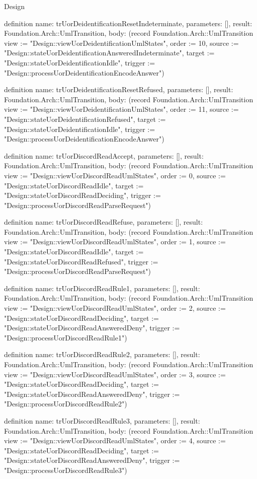 \begin{lexlean}{Design}
\begin{semanticmodule}
definition{
  name: trUorDeidentificationResetIndeterminate,
  parameters: [],
  result: Foundation.Arch::UmlTransition,
  body: (record Foundation.Arch::UmlTransition {view := "Design::viewUorDeidentificationUmlStates", order := 10, source := "Design::stateUorDeidentificationAnsweredIndeterminate", target := "Design::stateUorDeidentificationIdle", trigger := "Design::processUorDeidentificationEncodeAnswer"})
}

definition{
  name: trUorDeidentificationResetRefused,
  parameters: [],
  result: Foundation.Arch::UmlTransition,
  body: (record Foundation.Arch::UmlTransition {view := "Design::viewUorDeidentificationUmlStates", order := 11, source := "Design::stateUorDeidentificationRefused", target := "Design::stateUorDeidentificationIdle", trigger := "Design::processUorDeidentificationEncodeAnswer"})
}

definition{
  name: trUorDiscordReadAccept,
  parameters: [],
  result: Foundation.Arch::UmlTransition,
  body: (record Foundation.Arch::UmlTransition {view := "Design::viewUorDiscordReadUmlStates", order := 0, source := "Design::stateUorDiscordReadIdle", target := "Design::stateUorDiscordReadDeciding", trigger := "Design::processUorDiscordReadParseRequest"})
}

definition{
  name: trUorDiscordReadRefuse,
  parameters: [],
  result: Foundation.Arch::UmlTransition,
  body: (record Foundation.Arch::UmlTransition {view := "Design::viewUorDiscordReadUmlStates", order := 1, source := "Design::stateUorDiscordReadIdle", target := "Design::stateUorDiscordReadRefused", trigger := "Design::processUorDiscordReadParseRequest"})
}

definition{
  name: trUorDiscordReadRule1,
  parameters: [],
  result: Foundation.Arch::UmlTransition,
  body: (record Foundation.Arch::UmlTransition {view := "Design::viewUorDiscordReadUmlStates", order := 2, source := "Design::stateUorDiscordReadDeciding", target := "Design::stateUorDiscordReadAnsweredDeny", trigger := "Design::processUorDiscordReadRule1"})
}

definition{
  name: trUorDiscordReadRule2,
  parameters: [],
  result: Foundation.Arch::UmlTransition,
  body: (record Foundation.Arch::UmlTransition {view := "Design::viewUorDiscordReadUmlStates", order := 3, source := "Design::stateUorDiscordReadDeciding", target := "Design::stateUorDiscordReadAnsweredDeny", trigger := "Design::processUorDiscordReadRule2"})
}

definition{
  name: trUorDiscordReadRule3,
  parameters: [],
  result: Foundation.Arch::UmlTransition,
  body: (record Foundation.Arch::UmlTransition {view := "Design::viewUorDiscordReadUmlStates", order := 4, source := "Design::stateUorDiscordReadDeciding", target := "Design::stateUorDiscordReadAnsweredDeny", trigger := "Design::processUorDiscordReadRule3"})
}


\end{semanticmodule}
\end{lexlean}
